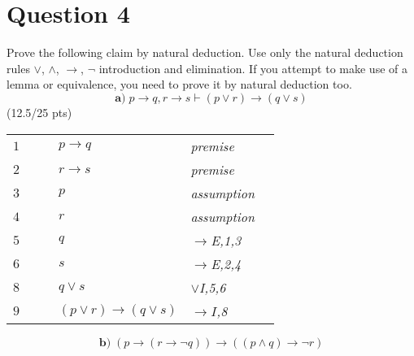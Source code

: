\documentclass[a4paper,12pt]{article}
\newcommand\tab[1][1cm]{\hspace*{#1}}
\begin{document}
\section*{Question 4 \hfill {}}
\tab Prove the following claim by natural deduction. Use only the natural deduction rules $\vee$, $\wedge$, $\rightarrow$, $\neg$ introduction and elimination. If you attempt to make use of a lemma or equivalence, you need to prove it by natural deduction too.
\begin{equation*}
    \textbf{a)} \; p \rightarrow q, r \rightarrow s \vdash (p \vee r) \rightarrow (q \vee s)
\end{equation*}
\hfill \small{(12.5/25 pts)}\\
\begin{tcolorbox}
\begin{table}[H]
	\centering

	\begin{tabular}{*6{l}}
		$1$ & & & $p \rightarrow q$ & \textit{premise} & \\
		
		$2$ & & & $r \rightarrow s$ & \textit{premise} & \\ \cline{2-6}
		 
		$3$ & \multicolumn{1}{|c}{} & & $p$ &\textit{assumption} &\multicolumn{1}{c|}{}\\ 
		
		$4$ & \multicolumn{1}{|c}{} & & $r$ &\textit{assumption} &\multicolumn{1}{c|}{}\\ 
		
		$5$ &\multicolumn{1}{|c}{}&& $q$ &{\textit{ $\rightarrow$E,1,3}}&\multicolumn{1}{c|}{}\\
		
		$6$ &\multicolumn{1}{|c}{}&& $s$ &{\textit{ $\rightarrow$E,2,4}}&\multicolumn{1}{c|}{} \\
		
		$8$ &\multicolumn{1}{|c}{}& & $q \vee s$ & {\textit{$\vee$I,5,6}} &\multicolumn{1}{c|}{}\\ \cline{2-6}
		
		$9$ & & & $(p \vee r) \rightarrow (q \vee s)$ & {\textit{$\rightarrow I$,8}} &\\ 
	\end{tabular}
\end{table}
\end{tcolorbox}
\begin{equation*}
     \textbf{b)} \;  (p \rightarrow (r \rightarrow \neg q)) \rightarrow ((p \wedge q) \rightarrow \neg r)
\end{equation*}
\end{document}
